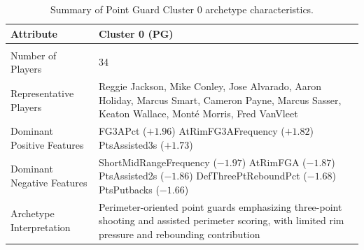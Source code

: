 \documentclass{article}
\begin{document}
\begin{table}[t]
\centering
\small
\caption{Summary of Point Guard Cluster 0 archetype characteristics.}
\label{tab:pg_cluster0}
\begin{tabular}{p{2cm} p{4.5cm}}
\hline
\textbf{Attribute} & \textbf{Cluster 0 (PG)} \\ 
\hline \\

Number of Players & 34 \\

Representative Players & Reggie Jackson, Mike Conley, Jose Alvarado, Aaron Holiday, 
Marcus Smart, Cameron Payne, Marcus Sasser, Keaton Wallace, Mont\'e Morris, Fred VanVleet 
\\

Dominant Positive Features &  FG3APct  ($+1.96$) \newline
 AtRimFG3AFrequency ($+1.82$)\newline
  PtsAssisted3s ($+1.73$) 
  \\

Dominant Negative Features &  ShortMidRangeFrequency ($-1.97$)\newline
 AtRimFGA ($-1.87$) \newline
PtsAssisted2s ($-1.86$) \newline
DefThreePtReboundPct ($-1.68$) \newline
PtsPutbacks ($-1.66$) 
\\

Archetype Interpretation & Perimeter-oriented point guards emphasizing three-point 
shooting and assisted perimeter scoring, with limited rim pressure and rebounding contribution 
\\ 

\hline
\end{tabular}
\end{table}
\end{document}
